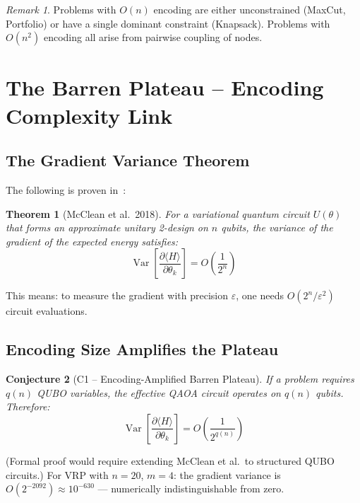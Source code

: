\documentclass[11pt]{article}
\newtheorem{theorem}{Theorem}[section]
\newtheorem{conjecture}[theorem]{Conjecture}
\theoremstyle{remark}
\newtheorem*{remark}{Remark}
\newcommand{\Var}{\operatorname{Var}}
\begin{document}
\begin{remark}
Problems with $O(n)$ encoding are either unconstrained (MaxCut, Portfolio)
or have a single dominant constraint (Knapsack). Problems with $O(n^2)$
encoding all arise from pairwise coupling of nodes.
\end{remark}

\section{The Barren Plateau -- Encoding Complexity Link}
\label{sec:barren}

\subsection{The Gradient Variance Theorem}

The following is proven in~\cite{mcclean2018barren}:

\begin{theorem}[McClean et al.\ 2018]
For a variational quantum circuit $U(\theta)$ that forms an approximate
unitary 2-design on $n$ qubits, the variance of the gradient of the expected
energy satisfies:
\begin{equation}
  \Var\!\left[\frac{\partial \langle H \rangle}{\partial \theta_k}\right]
  = O\!\left(\frac{1}{2^n}\right)
\end{equation}
\end{theorem}

\noindent This means: to measure the gradient with precision $\varepsilon$,
one needs $O(2^n / \varepsilon^2)$ circuit evaluations.

\subsection{Encoding Size Amplifies the Plateau}

\begin{conjecture}[C1 -- Encoding-Amplified Barren Plateau]
\label{conj:C1}
If a problem requires $q(n)$ QUBO variables, the effective QAOA circuit
operates on $q(n)$ qubits. Therefore:
\begin{equation}
  \Var\!\left[\frac{\partial \langle H \rangle}{\partial \theta_k}\right]
  = O\!\left(\frac{1}{2^{q(n)}}\right)
\end{equation}
\end{conjecture}

\noindent (Formal proof would require extending McClean et al.\ to structured
QUBO circuits.) For VRP with $n=20$, $m=4$: the gradient variance is
$O(2^{-2092}) \approx 10^{-630}$ --- numerically indistinguishable from zero.
\end{document}
